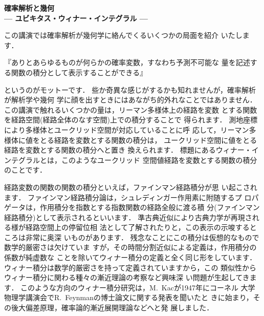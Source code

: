 \documentclass[uplatex,dvipdfmx]{jlreq}
\begin{document}
\newpage

\begin{center}
  {\Large\bfseries 確率解析と幾何\\
  \normalsize --- ユビキタス・ウィナー・インテグラル ---}
\end{center}

\bigskip
\hspace*{\fill}{\large\bfseries 谷口　説男（九州大学大学院数理学研究院）}

\bigskip

この講演では確率解析が幾何学に絡んでくるいくつかの局面を紹介
いたします．

\begin{center}
\begin{minipage}{11cm}
『ありとあらゆるものが何らかの確率変数，すなわち予測不可能な
量を記述する関数の積分として表示することができる』
\end{minipage}
\end{center}
というのがモットーです．
些か奇異な感じがするかも知れませんが，確率解析が解析学や幾何
学に顔を出すときにはあながち的外れなことではありません．
この講演で触れるいくつかの量は，リーマン多様体上の経路を変数
とする関数を経路空間(経路全体のなす空間)上での積分することで
得られます．
測地座標により多様体とユークリッド空間が対応していることに呼
応して，リーマン多様体に値をとる経路を変数とする関数の積分は，
ユークリッド空間に値をとる経路を変数とする関数の積分へと置き
換えられます．
標題にあるウィナー・インテグラルとは，このようなユークリッド
空間値経路を変数とする関数の積分のことです．

経路変数の関数の関数の積分といえば，ファインマン経路積分が思
い起こされます．
ファインマン経路積分論は，シュレディンガー作用素に附随するプ
ロパゲータは，作用積分を指数とする指数関数の経路全般に渡る積
分(ファインマン経路積分)として表示されるといいます．
準古典近似により古典力学が再現される様が経路空間上の停留位相
法として了解されたりと，この表示の示唆するところは非常に奥深
いものがあります．
残念なことにこの積分は仮想的なもので数学的厳密さは欠けていま
すが，その時間分割近似による定義は，作用積分の係数が純虚数な
ことを除いてウィナー積分の定義と全く同じ形をしています．
ウィナー積分は数学的厳密さを持って定義されていますから，この
類似性からウィナー積分に関わる種々の漸近理論の考察など興味深
い問題が生起してきます．
このような方向のウィナー積分研究は，M.~Kacが1947年にコーネル
大学物理学講演会でR.~Feynmanの博士論文に関する発表を聞いたと
きに始まり，その後大偏差原理，確率論的漸近展開理論などへと発
展しました．
\end{document}
